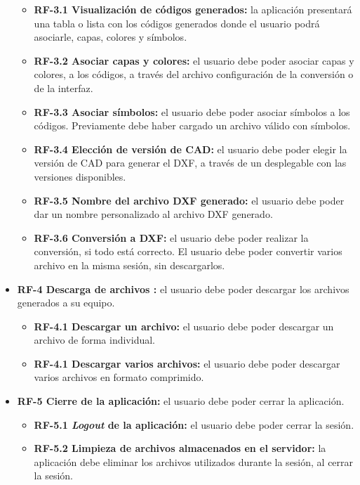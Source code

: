 \begin{itemize}
\begin{itemize}
\item \textbf{RF-3.1 Visualización de códigos generados: }la aplicación presentará una tabla o lista con los códigos generados donde el usuario podrá asociarle, capas, colores y símbolos. 

\item \textbf{RF-3.2 Asociar capas y colores: }el usuario debe poder asociar capas y colores, a los códigos, a través del archivo configuración de la conversión o de la interfaz. 

\item \textbf{RF-3.3 Asociar símbolos: }el usuario debe poder asociar símbolos a los códigos. Previamente debe haber cargado un archivo válido con símbolos. 

\item \textbf{RF-3.4 Elección de versión de CAD: }el usuario debe poder elegir la versión de CAD para generar el DXF, a través de un desplegable con las versiones disponibles.

\item \textbf{RF-3.5 Nombre del archivo DXF generado: }el usuario debe poder dar un nombre personalizado al archivo DXF generado.
	
\item \textbf{RF-3.6 Conversión a DXF: }el usuario debe poder realizar la conversión, si todo está correcto. El usuario debe poder convertir varios archivo en la misma sesión, sin descargarlos.
\end{itemize}

\item \textbf{RF-4 Descarga de archivos :} el usuario debe poder descargar los archivos generados a su equipo.

\begin{itemize}
\item \textbf{RF-4.1 Descargar un archivo: }el usuario debe poder descargar un archivo de forma individual.

\item \textbf{RF-4.1 Descargar varios archivos: }el usuario debe poder descargar varios archivos en formato comprimido.

\end{itemize}

\item \textbf{RF-5 Cierre de la aplicación: }el usuario debe poder cerrar la aplicación.

\begin{itemize}
\item \textbf{RF-5.1 \emph{Logout} de la aplicación: }el usuario debe poder cerrar la sesión.

\item \textbf{RF-5.2 Limpieza de archivos almacenados en el servidor: }la aplicación debe eliminar los archivos utilizados durante la sesión, al cerrar la sesión.

\end{itemize}

\end{itemize}



